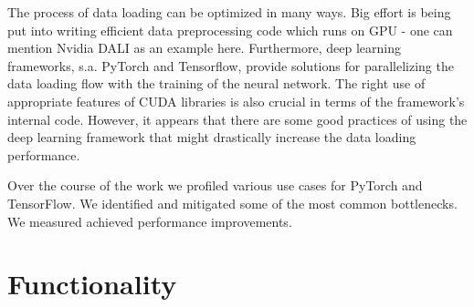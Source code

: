 \documentclass[licencjacka,en]{pracamgr}
\begin{document}
The process of data loading can be optimized in many ways. Big effort is being put into writing efficient data preprocessing code which runs on GPU - one can mention Nvidia DALI as an example here. Furthermore, deep learning frameworks, s.a. PyTorch and Tensorflow, provide solutions for parallelizing the data loading flow with the training of the neural network. The right use of appropriate features of CUDA libraries is also crucial in terms of the framework’s internal code. However, it appears that there are some good practices of using the deep learning framework that might drastically increase the data loading performance.

Over the course of the work we profiled various use cases for PyTorch and TensorFlow. We identified and mitigated some of the most common bottlenecks. We measured achieved performance improvements.

\section*{Functionality}

\end{document}
